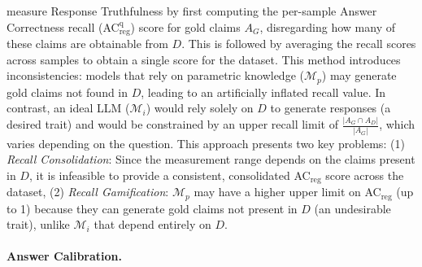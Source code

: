 \documentclass{article} %
\begin{document}
\citet{gao2023enabling} measure Response Truthfulness by first computing the per-sample Answer Correctness recall (AC$_\text{reg}^\text{q}$) score for gold claims \( A_G \), disregarding how many of these claims are obtainable from \( D \). This is followed by averaging the recall scores across samples to obtain a single score for the dataset. This method introduces inconsistencies: models that rely on parametric knowledge (\(\mathcal{M}_{p}\)) may generate gold claims not found in \(D\), leading to an artificially inflated recall value. In contrast, an ideal LLM (\(\mathcal{M}_{i}\)) would rely solely on \(D\) to generate responses (a desired trait) and would be constrained by an upper recall limit of \(\frac{|A_G \cap A_D|}{|A_G|}\), which varies depending on the question.
This approach presents two key problems: (1) \textit{Recall Consolidation}: Since the measurement range depends on the claims present in \(D\), it is infeasible to provide a consistent, consolidated AC$_\text{reg}$ score across the dataset, (2) \textit{Recall Gamification}: \(\mathcal{M}_{p}\) may have a higher upper limit on AC$_\text{reg}$ (up to 1) because they can generate gold claims not present in \(D\) (an undesirable trait), unlike \(\mathcal{M}_{i}\) that depend entirely on \(D\).

\paragraph{Answer Calibration.} 
\end{document}
